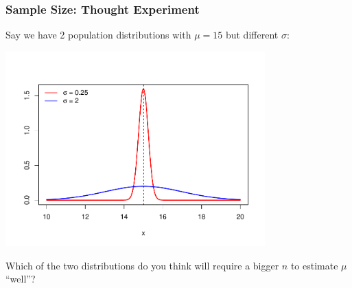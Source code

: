 \documentclass[handout]{beamer}
\begin{document}
\begin{frame}
\frametitle{Sample Size:  Thought Experiment}
Say we have 2 population distributions with $\mu=15$ but different $\sigma$:

\begin{center}
\includegraphics[width=0.75\textwidth]{figure/norm.pdf}
\end{center}

\pause Which of the two distributions do you think will require a bigger $n$ to estimate $\mu$ ``well''?
\end{frame}
\end{document}
